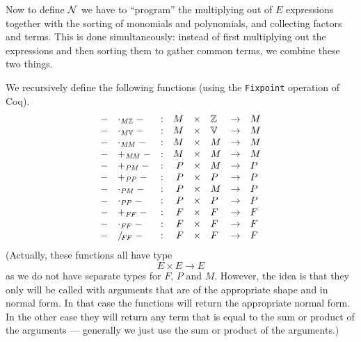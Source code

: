 \documentclass[runningheads]{llncs}
\newcommand{\N}{{\cal N}}
\newcommand{\Z}{{\mathbb Z}}
\newcommand{\V}{{\mathbb V}}
\begin{document}
Now to define $\N$ we have to ``program'' the multiplying out of $E$
expressions together with the sorting of monomials and polynomials,
and collecting factors and terms.
This is done simultaneously:
instead of first multiplying out the expressions and then sorting
them to gather common terms, we combine these two things.

We recursively define the following functions
(using the \texttt{Fixpoint} operation of Coq).
$$
\begin{array}{rlcrclcl}
- &\cdot_{\it M\Z}\; - &:& M &\times& \Z &\to& M \\
- &\cdot_{\it M\V}\; - &:& M &\times& \V &\to& M \\
- &\cdot_{\it MM}\; - &:& M &\times& M &\to& M \\
- &+_{\it MM}\; - &:& M &\times& M &\to& M \\
- &+_{\it PM}\; - &:& P &\times& M &\to& P \\
- &+_{\it PP}\; - &:& P &\times& P &\to& P \\
- &\cdot_{\it PM}\; - &:& P &\times& M &\to& P \\
- &\cdot_{\it PP}\; - &:& P &\times& P &\to& P \\
- &+_{\it FF}\; - &:& F &\times& F &\to& F \\
- &\cdot_{\it FF}\; - &:& F &\times& F &\to& F \\
- &/\!_{\it FF}\; - &:& F &\times& F &\to& F
\end{array}
$$
(Actually, these functions all have type $$E \times E \to E$$
as we do not have separate types for $F$, $P$ and $M$.
However, the idea is that they only will be called with arguments
that are of the appropriate shape and in normal form.
In that case the functions will return the appropriate normal form.
In the other case they will return any term that is equal to
the sum or product of the arguments --- generally we just use the sum
or product of the arguments.)
\end{document}
